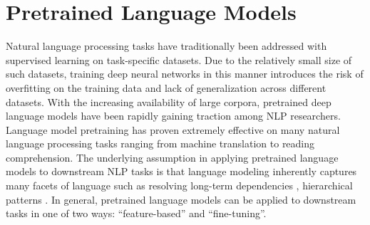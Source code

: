 
\section{Pretrained Language Models}
\label{lm}

Natural language processing tasks have traditionally been addressed with supervised learning on task-specific datasets.
Due to the relatively small size of such datasets, training deep neural networks in this manner introduces the risk of overfitting on the training data and lack of generalization across different datasets.
With the increasing availability of large corpora, pretrained deep language models have been rapidly gaining traction among NLP researchers.
Language model pretraining has proven extremely effective on many natural language processing tasks ranging from machine translation to reading comprehension.
The underlying assumption in applying pretrained language models to downstream NLP tasks is that language modeling inherently captures many facets of language such as resolving long-term dependencies \cite{DBLP:journals/corr/LinzenDG16}, hierarchical patterns \cite{DBLP:journals/corr/abs-1803-11138}.
In general, pretrained language models can be applied to downstream tasks in one of two ways: ``feature-based'' and ``fine-tuning''.

